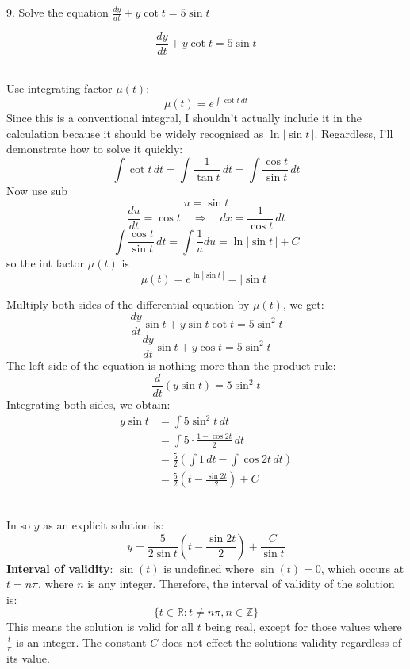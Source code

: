\documentclass[a4paper, 12pt]{report}
\def\ni{green!60!black!40!white}
\begin{document}
    \begin{tcolorbox}[title={\color{black}\section{Q9}}, colback=white, colframe=\ni, boxrule=1mm, width=1\textwidth]
        9. Solve the equation \( \frac{dy}{dt} + y \cot t = 5 \sin t \)
    \end{tcolorbox}    
    \[\frac{dy}{dt} + y \cot t = 5 \sin t\]\\[1em]
    \begin{minipage}{0.42\textwidth}
        Use integrating factor \( \mu(t) \):
        \[\mu(t) = e^{\int \cot t \, dt}\]
        Since this is a conventional integral, I shouldn't actually include it in the calculation because it should be widely recognised as \(\ln|\sin t \,|\). Regardless, I'll demonstrate how to solve it quickly:        
        \[\int \cot t \, dt = \int \frac{1}{\tan t} \, dt = \int \frac{\cos t}{\sin t} \, dt\]
        Now use sub
        \[u = \sin t\]
        \[\frac{du}{dt} = \cos t \quad \Rightarrow \quad dx = \frac{1}{\cos t} \, dt\]
        \[\int \frac{\cos t}{\sin t} \, dt = \int \frac{1}{u} du = \ln|\sin t\,|+C\]
        so the int factor \(\mu(t)\) is
        \[\mu(t) =e^{\ln |\sin t\,|} = |\sin t\,|\]
    \end{minipage}\hfil%
    \begin{minipage}{0.42\textwidth}
        Multiply both sides of the differential equation by \( \mu(t) \), we get:
    \[\frac{dy}{dt}\sin t  + y \sin t \cot t = 5 \sin^2 t\]
    \[\frac{dy}{dt}\sin t  + y\cos t = 5 \sin^2 t\]
    The left side of the equation is nothing more than the product rule:
    \[\frac{d}{dt} (y \sin t) = 5 \sin^2 t\]
    Integrating both sides, we obtain:
    \begin{align*}
        y \sin t &= \int 5 \sin^2 t \, dt\\
        &= \int 5 \cdot \frac{1 - \cos 2t}{2} \, dt\\ 
        &= \frac{5}{2} \left( \int 1 \, dt - \int \cos 2t \, dt \right)\\
        &= \frac{5}{2} \left( t - \frac{\sin 2t}{2} \right) + C
    \end{align*}
    \end{minipage}\\[2em]
    In so \(y\) as an explicit solution is:
    \[\boxed{y = \frac{5}{2 \sin t} \left( t - \frac{\sin 2t}{2} \right) + \frac{C}{\sin t}}\]
    \textbf{Interval of validity}: \( \sin(t) \) is undefined where \( \sin(t) = 0 \), which occurs at \( t = n\pi \), where \( n \) is any integer. Therefore, the interval of validity of the solution is:
    \[\{t \in \mathbb{R} : t \neq n\pi, n \in \mathbb{Z}\}\]
    This means the solution is valid for all \( t \) being real, except for those values where \( \frac{t}{\pi} \) is an integer. The constant \(C\) does not effect the solutions validity regardless of its value.
    
\end{document}
